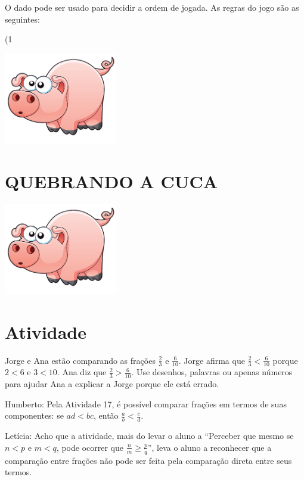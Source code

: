 \documentclass[a4,12pt]{book}
\newcounter{atividade}
\begin{document}
O dado pode ser usado para decidir a ordem de jogada. As regras do jogo são as seguintes:

(1

\includegraphics[width=\textwidth,height=4cm, keepaspectratio]{pig}
\section*{ QUEBRANDO A CUCA }
 





\includegraphics[width=\textwidth,height=4cm, keepaspectratio]{pig}
\section{Atividade}







Jorge e Ana estão comparando as frações $\frac{2}{3}$ e $\frac{6}{10}$. Jorge afirma que 
$\frac{2}{3} < \frac{6}{10}$ porque $2 < 6$ e $3 < 10$. Ana diz que $\frac{2}{3} > \frac{6}{10}$. Use desenhos, palavras ou apenas números para ajudar Ana a explicar a Jorge porque ele está errado.






Humberto:
Pela Atividade 17, é possível comparar frações em termos de suas componentes: se $ad < bc$, então
$\frac{a}{b} < \frac{c}{d}$.

Letícia:
Acho que a atividade, mais do levar o aluno a ``Perceber que mesmo se $n < p$ e $m < q$, pode ocorrer que $\frac{n}{m} \geq \frac{p}{q}$'', leva o aluno a reconhecer que a comparação entre frações não pode ser feita pela comparação direta entre seus termos.
\end{document}
